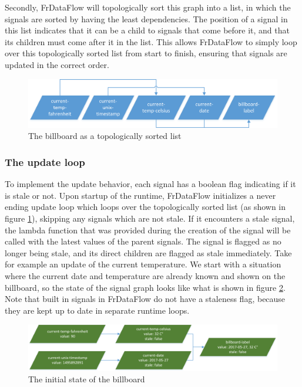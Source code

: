 Secondly, FrDataFlow will topologically sort this graph into a list, in which the signals are sorted by having the least dependencies. The position of a signal in this list indicates that it can be a child to signals that come before it, and that its children must come after it in the list. This allows FrDataFlow to simply loop over this topologically sorted list from start to finish, ensuring that signals are updated in the correct order. 

\begin{figure}[h]
	\centerline{\includegraphics[width=\textwidth]{images/language-frdataflow-topologically-sorted-list.png}}
	\caption{The billboard as a topologically sorted list}
	\label{fig:language-frdataflow-topologically-sorted-list}
\end{figure}

\subsubsection{The update loop}

To implement the update behavior, each signal has a boolean flag indicating if it is stale or not. 
Upon startup of the runtime, FrDataFlow initializes a never ending update loop which loops over the topologically sorted list (as shown in figure \ref{fig:language-frdataflow-topologically-sorted-list}), skipping any signals which are not stale. 
If it encounters a stale signal, the lambda function that was provided during the creation of the signal will be called with the latest values of the parent signals. The signal is flagged as no longer being stale, and its direct children are flagged as stale immediately. Take for example an update of the current temperature. We start with a situation where the current date and temperature are already known and shown on the billboard, so the state of the signal graph looks like what is shown in figure \ref{fig:language-frdataflow-1}. 
Note that built in signals in FrDataFlow do not have a staleness flag, because they are kept up to date in separate runtime loops. 

\begin{figure}[h]
	\centerline{\includegraphics[width=\textwidth]{images/language-frdataflow-1.png}}
	\caption{The initial state of the billboard}
	\label{fig:language-frdataflow-1}
\end{figure}

